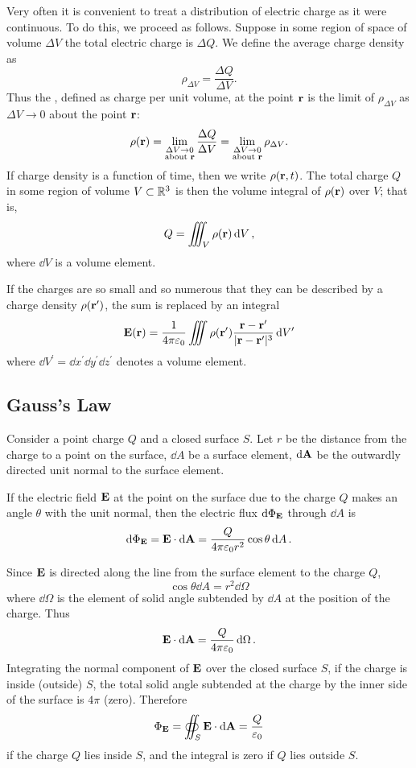 Very often it is convenient to treat a distribution of electric charge as it were continuous. To do this, we proceed as follows. Suppose in some region of space of volume $\Delta V$ the total electric charge is $\Delta Q$. We define the average charge density as
\[\rho_{\Delta V}=\frac{\Delta Q}{\Delta V}.\]
Thus the , defined as charge per unit volume, at the point $\vb{r}$ is the limit of $\rho_{\Delta V}$ as $\Delta V\to0$ about the point $\vb{r}$:
\[\rho(\vb{r})=\lim_{\substack{\Delta V\to0\\ \text{about }\vb{r}}}\frac{\Delta Q}{\Delta V}=\lim_{\substack{\Delta V\to0\\ \text{about }\vb{r}}}\rho_{\Delta V}.\]
If charge density is a function of time, then we write $\rho(\vb{r},t)$. The total charge $Q$ in some region of volume $V\subset\mathbb R^3$ is then the volume integral of $\rho(\vb{r})$ over $V$; that is,
\[Q=\iiint_V\rho(\vb{r})\dd{V},\]
where $\dd{V}$ is a volume element.

If the charges are so small and so numerous that they can be described by a charge density $\rho(\vb{r}^\prime)$, the sum is replaced by an integral
\[\vb{E}(\vb{r})=\frac{1}{4\pi\varepsilon_0}\iiint\rho(\vb{r}^\prime)\frac{\vb{r}-\vb{r}^\prime}{|\vb{r}-\vb{r}^\prime|^3}\dd{V^\prime}\]
where $\dd{V^\prime}=\dd{x^\prime}\dd{y^\prime}\dd{z^\prime}$ denotes a volume element.

\subsection{Gauss's Law}
Consider a point charge $Q$ and a closed surface $S$. Let $r$ be the distance from the charge to a point on the surface, $\dd{A}$ be a surface element, $\dd{\vb{A}}$ be the outwardly directed unit normal to the surface element.

If the electric field $\vb{E}$ at the point on the surface due to the charge $Q$ makes an angle $\theta$ with the unit normal, then the electric flux $\dd{\Phi}_{\vb{E}}$ through $\dd{A}$ is
\[\dd{\Phi}_{\vb{E}}=\vb{E}\cdot\dd{\vb{A}}=\frac{Q}{4\pi\varepsilon_0r^2}\cos\theta\dd{A}.\]

Since $\vb{E}$ is directed along the line from the surface element to the charge $Q$,
\[\cos\theta\dd{A}=r^2\dd{\Omega}\]
where $\dd{\Omega}$ is the element of solid angle subtended by $\dd{A}$ at the position of the charge. Thus
\[\vb{E}\cdot\dd{\vb{A}}=\frac{Q}{4\pi\varepsilon_0}\dd{\Omega}.\]
Integrating the normal component of $\vb{E}$ over the closed surface $S$, if the charge is inside (outside) $S$, the total solid angle subtended at the charge by the inner side of the surface is $4\pi$ (zero). Therefore
\[\Phi_{\vb{E}}=\oiint_S\vb{E}\cdot\dd{\vb{A}}=\frac{Q}{\varepsilon_0}\]
if the charge $Q$ lies inside $S$, and the integral is zero if $Q$ lies outside $S$.

